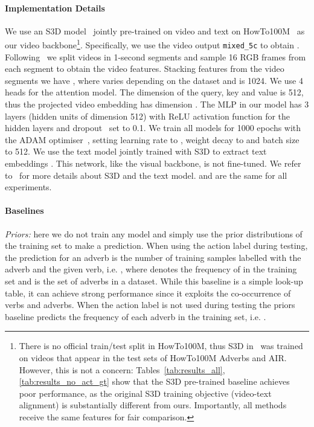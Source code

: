\documentclass[10pt,twocolumn,letterpaper]{article}
\newcommand{\fparagraph}[1]{\paragraph{#1}}
\begin{document}
\fparagraph{Implementation Details}
We use an S3D model~\cite{xie2018rethinking,miech19endtoend} jointly pre-trained on video and text on HowTo100M~\cite{miech19howto100m} as our video backbone\footnote{There is no official train/test split in HowTo100M, thus S3D in~\cite{miech19endtoend} was trained on videos that appear in the test sets of HowTo100M Adverbs and AIR. However, this is not a concern: Tables~\ref{tab:results_all},  \ref{tab:results_no_act_gt} show that the S3D pre-trained baseline achieves poor performance, as the original S3D training objective (video-text alignment) is substantially different from ours. Importantly, all methods
receive the same features for fair comparison.}. Specifically, we use the video output \texttt{mixed\_5c} to obtain . Following~\cite{doughty2020action} we split videos in 1-second segments and sample 16 RGB frames from each segment to obtain the video features. 
Stacking features from the video segments we have , where  varies depending on the dataset and  is 1024. We use 4 heads for the attention model. 
The dimension  of the query, key and value is 512, thus the projected video embedding  has dimension . 
The MLP in our model has 3 layers (hidden units of dimension 512) with ReLU activation function for the hidden layers and dropout~\cite{srivastava2014dropout} set to 0.1. 
We train all models for 1000 epochs with the ADAM optimiser~\cite{kingma2015adam}, setting learning rate to , weight decay to  and batch size to 512. We use the text model jointly trained with S3D to extract text embeddings . This network, like the visual backbone, is not fine-tuned. We refer to~\cite{miech19endtoend} for more details about S3D and the text model.  and  are the same for all experiments.

\vspace{-12pt}

\fparagraph{Baselines} \textit{Priors:} here we do not train any model and simply use the prior distributions of the training set to make a prediction. When using the action label during testing, the prediction for an adverb is the number of training samples labelled with the adverb and the given verb, i.e. , where  denotes the frequency of  in the training set and  is the set of adverbs in a dataset. While this baseline is a simple look-up table, it can achieve strong performance since it exploits the co-occurrence of verbs and adverbs. When the action label is not used during testing the priors baseline predicts the frequency of each adverb in the training set, i.e. .
\end{document}
